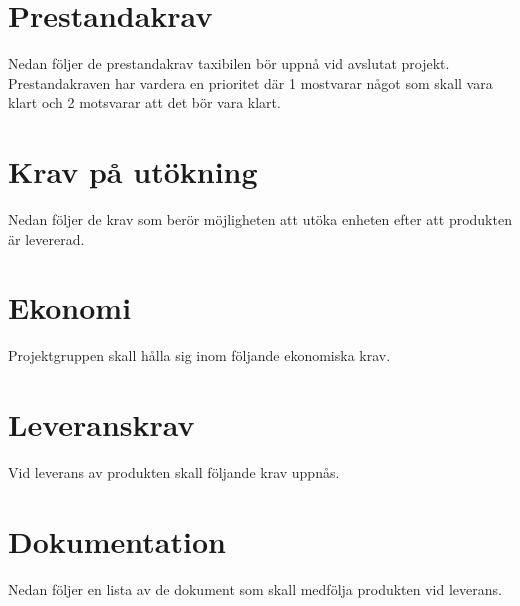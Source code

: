 \documentclass[kravspec/krav.tex]{subfiles}
\begin{document}
\section{Prestandakrav}
Nedan följer de prestandakrav taxibilen bör uppnå vid avslutat projekt.
Prestandakraven har vardera en prioritet där 1 mostvarar något som skall vara
klart och 2 motsvarar att det bör vara klart.

\begin{reqlist}
\end{reqlist}

\section{Krav på utökning}
Nedan följer de krav som berör möjligheten att utöka enheten efter att
produkten är levererad.

\begin{reqlist}
\end{reqlist}

\section{Ekonomi}
Projektgruppen skall hålla sig inom följande ekonomiska krav.

\begin{reqlist}
\end{reqlist}

\section{Leveranskrav}
Vid leverans av produkten skall följande krav uppnås.

\begin{reqlist}
\end{reqlist}

\section{Dokumentation}
\label{sec:doc}
Nedan följer en lista av de dokument som skall medfölja produkten vid leverans.
\end{document}
